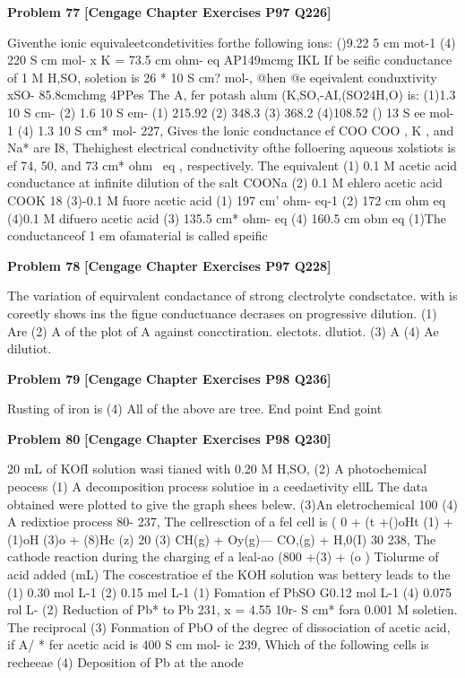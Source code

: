 \begin{problembox}
\textbf{Problem 77} \hfill \textbf{[Cengage Chapter Exercises P97 Q226]}
\label{q:ext-cng-th-77}

Giventhe ionic equivaleetcondetivities forthe following ions:
()9.22 5 cm mot-1
(4) 220 S cm mol-
x  K  = 73.5 cm ohm- eq
AP149mcmg
IKL If be seific conductance of 1 M H,SO, soletion is
26 * 10  S cm? mol-, @hen @e eqeivalent conduxtivity
xSO- 85.8cmchmg
4PPes
The A, fer potash alum (K,SO,-AI,(SO24H,O) is:
(1)1.3   10  S cm-
(2) 1.6   10  S em-
(1) 215.92
(2) 348.3
(3) 368.2
(4)108.52
() 13 S ee mol-1
(4) 1.3   10 S cm* mol-
227, Gives the lonic conductance ef
COO
COO
, K , and Na* are
I8, Thehighest electrical conductivity ofthe folloering aqueous
xolstiots is ef
74, 50, and 73 cm* ohm~ eq , respectively. The equivalent
(1) 0.1 M acetic acid
conductance at infinite dilution of the salt
COONa
(2) 0.1 M ehlero acetic acid
COOK
18
(3)-0.1 M fuore acetic acid
(1) 197 cm' ohm- eq-1
(2) 172 cm ohm eq
(4)0.1 M difuero acetic acid
(3) 135.5 cm* ohm- eq  (4) 160.5 cm  obm eq
(1)The conductanceof 1 em ofamaterial is called speific
\end{problembox}

\begin{problembox}
\textbf{Problem 78} \hfill \textbf{[Cengage Chapter Exercises P97 Q228]}
\label{q:ext-cng-th-78}

The variation of equirvalent condactance of strong clectrolyte
condsctatce.
with   is coreetly shows ins the figue
conductuance decrases on progressive dilution.
(1) Are
(2) A
of the plot of A against concctiration.
electots.
dlutiot.
(3) A
(4) Ae
dilutiot.
\end{problembox}

\begin{problembox}
\textbf{Problem 79} \hfill \textbf{[Cengage Chapter Exercises P98 Q236]}
\label{q:ext-cng-th-79}

Rusting of iron is
(4) All of the above are tree.
End point
End goint
\end{problembox}

\begin{problembox}
\textbf{Problem 80} \hfill \textbf{[Cengage Chapter Exercises P98 Q230]}
\label{q:ext-cng-th-80}

20 mL of KOfI solution wasi tianed with 0.20 M H,SO,
(2) A photochemical peocess
(1) A decomposition process
solutioe in a ceedaetivity ellL The data obtained were
plotted to give the graph shees belew.
(3)An eletrochemical
100
(4) A redixtioe process
80-
237, The cellresction of a fel cell is
( 0 + (t  +()oHt (1)
+
(1)oH (3)o + (8)Hc (z)
20
(3) CH(g) + Oy(g)---  CO,(g) + H,0(I)
30
238, The cathode reaction during the charging ef a leal-ao
(800 +(3)  + (o )
Tiolurme of acid added (mL)
The coscestratioe ef the KOH solution was
bettery leads to the
(1) 0.30 mol L-1
(2) 0.15 mel L-1
(1) Fomation ef PbSO
G0.12 mol L-1
(4) 0.075 rol L-
(2) Reduction of Pb* to Pb
231, x = 4.55   10r- S cm* fora 0.001 M soletien. The reciprocal
(3) Fonmation of PbO
of the degrec of dissociation of acetic acid, if A/ * fer acetic
acid is 400 S cm  mol- ic
239, Which of the following cells is recheeae
(4) Deposition of Pb at the anode
\end{problembox}

